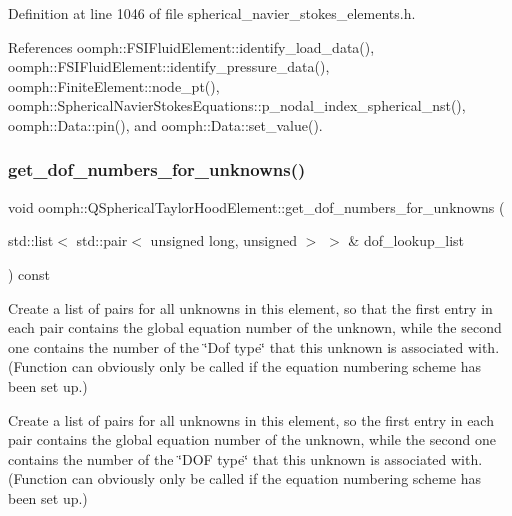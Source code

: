 Definition at line 1046 of file spherical\+\_\+navier\+\_\+stokes\+\_\+elements.\+h.



References oomph\+::\+F\+S\+I\+Fluid\+Element\+::identify\+\_\+load\+\_\+data(), oomph\+::\+F\+S\+I\+Fluid\+Element\+::identify\+\_\+pressure\+\_\+data(), oomph\+::\+Finite\+Element\+::node\+\_\+pt(), oomph\+::\+Spherical\+Navier\+Stokes\+Equations\+::p\+\_\+nodal\+\_\+index\+\_\+spherical\+\_\+nst(), oomph\+::\+Data\+::pin(), and oomph\+::\+Data\+::set\+\_\+value().

\mbox{\label{classoomph_1_1QSphericalTaylorHoodElement_a62c62fd109c074654a239bcfb99522c6}} 
\subsubsection{\texorpdfstring{get\+\_\+dof\+\_\+numbers\+\_\+for\+\_\+unknowns()}{get\_dof\_numbers\_for\_unknowns()}}
{\footnotesize\ttfamily void oomph\+::\+Q\+Spherical\+Taylor\+Hood\+Element\+::get\+\_\+dof\+\_\+numbers\+\_\+for\+\_\+unknowns (\begin{DoxyParamCaption}\item[{std\+::list$<$ std\+::pair$<$ unsigned long, unsigned $>$ $>$ \&}]{dof\+\_\+lookup\+\_\+list }\end{DoxyParamCaption}) const\hspace{0.3cm}{\ttfamily [virtual]}}



Create a list of pairs for all unknowns in this element, so that the first entry in each pair contains the global equation number of the unknown, while the second one contains the number of the \char`\"{}\+Dof type\char`\"{} that this unknown is associated with. (Function can obviously only be called if the equation numbering scheme has been set up.) 

Create a list of pairs for all unknowns in this element, so the first entry in each pair contains the global equation number of the unknown, while the second one contains the number of the \char`\"{}\+D\+O\+F type\char`\"{} that this unknown is associated with. (Function can obviously only be called if the equation numbering scheme has been set up.) 

